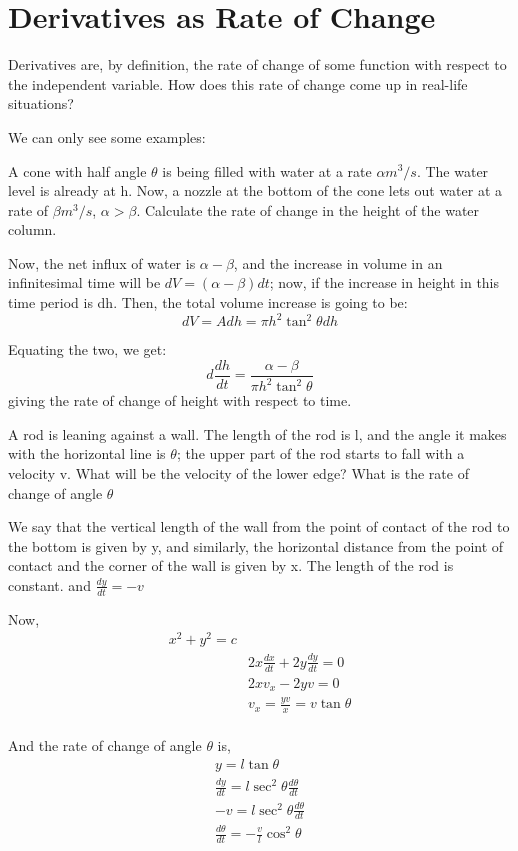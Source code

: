 \section{Derivatives as Rate of Change}

Derivatives are, by definition, the rate of change of some function with respect to the independent variable. How does this rate of change come up in real-life situations?

We can only see some examples:

\begin{Enumerate}
    \item A cone with half angle $\theta$ is being filled with water at a rate $\alpha m^3/s$. The water level is already at h. Now, a nozzle at the bottom of the cone lets out water at a rate of $\beta m^3/s$, $\alpha>\beta$. Calculate the rate of change in the height of the water column.


    \begin{outline}
        Now, the net influx of water is $\alpha -\beta$, and the increase in volume in an infinitesimal time will be $dV=(\alpha-\beta)dt$; now, if the increase in height in this time period is dh. Then, the total volume increase is going to be: 
        $$dV=Adh=\pi h^2 \tan^2\theta dh$$

        Equating the two, we get:
        $$d\frac{dh}{dt}= \frac{\alpha-\beta}{\pi h^2 \tan^2\theta}$$
        giving the rate of change of height with respect to time.
         \end{outline}


    \item A rod is leaning against a wall. The length of the rod is l, and the angle it makes with the horizontal line is $\theta$; the upper part of the rod starts to fall with a velocity v. What will be the velocity of the lower edge? What is the rate of change of angle $\theta$

    We say that the vertical length of the wall from the point of contact of the rod to the bottom is given by y, and similarly, the horizontal distance from the point of contact and the corner of the wall is given by x. The length of the rod is constant. and $\frac{dy}{dt}=-v$

    Now, $$
    \begin{aligned}
    x^2+y^2=c\\
    & 2x\frac{dx}{dt}+ 2y\frac{dy}{dt}=0\\
    & 2xv_x -2yv=0\\
    & v_x  = \frac{yv}{x}=v\tan\theta\\
    \end{aligned}
     $$

     And the rate of change of angle $\theta$ is, 
     $$
     \begin{aligned}
         y=l\tan\theta\\
         \frac{dy}{dt}=l\sec^2\theta \frac{d\theta}{dt}\\
         -v=l\sec^2\theta \frac{d\theta}{dt}\\
         \frac{d\theta}{dt}=-\frac{v}{l}\cos^2\theta\\
     \end{aligned}$$
\end{Enumerate}